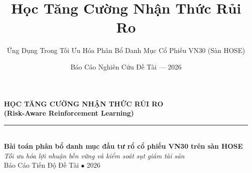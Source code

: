 \documentclass[aspectratio=169, 10pt]{beamer}
\title[\textbf{Risk-Aware RL cho VN30}]{\huge \textbf{Học Tăng Cường Nhận Thức Rủi Ro}}
\subtitle{\Large Ứng Dụng Trong Tối Ưu Hóa Phân Bổ Danh Mục Cổ Phiếu VN30 (Sàn HOSE)}
\author{}
\institute{}
\date{\normalsize Báo Cáo Nghiên Cứu Đề Tài --- 2026}
\begin{document}
\begin{frame}[plain]
  \vspace{3.5em}
  \begin{center}
    {\color{MainNavy}\huge \textbf{HỌC TĂNG CƯỜNG NHẬN THỨC RỦI RO}}\\[0.8ex]
    {\color{SecondaryNavy}\Large \textbf{(Risk-Aware Reinforcement Learning)}}\\[1.5ex]
    {\color{AccentCyan}\rule{0.5\textwidth}{1.5pt}}\\[2.5ex]
    {\large \textbf{Bài toán phân bổ danh mục đầu tư rổ cổ phiếu VN30 trên sàn HOSE}}\\[1.5ex]
    {\normalsize \textit{Tối ưu hóa lợi nhuận bền vững và kiểm soát sụt giảm tài sản}}\\[4ex]
    
    {\footnotesize \color{gray} Báo Cáo Tiến Độ Đề Tài $\bullet$ 2026}
  \end{center}
\end{frame}
\end{document}
